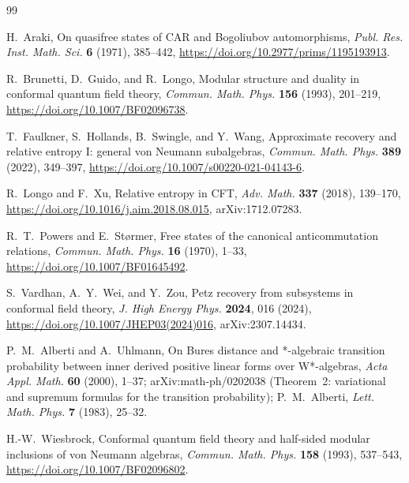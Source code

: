 \documentclass[11pt]{article}
\theoremstyle{accent}
\theoremstyle{definition}
\begin{document}
\begin{thebibliography}{99}

H.~Araki,
\newblock On quasifree states of CAR and Bogoliubov automorphisms,
\newblock \emph{Publ. Res. Inst. Math. Sci.} \textbf{6} (1971), 385--442,
\newblock \url{https://doi.org/10.2977/prims/1195193913}.

R.~Brunetti, D.~Guido, and R.~Longo,
\newblock Modular structure and duality in conformal quantum field theory,
\newblock \emph{Commun. Math. Phys.} \textbf{156} (1993), 201--219,
\newblock \url{https://doi.org/10.1007/BF02096738}.

T.~Faulkner, S.~Hollands, B.~Swingle, and Y.~Wang,
\newblock Approximate recovery and relative entropy I: general von Neumann subalgebras,
\newblock \emph{Commun. Math. Phys.} \textbf{389} (2022), 349--397,
\newblock \url{https://doi.org/10.1007/s00220-021-04143-6}.

R.~Longo and F.~Xu,
\newblock Relative entropy in CFT,
\newblock \emph{Adv. Math.} \textbf{337} (2018), 139--170,
\newblock \url{https://doi.org/10.1016/j.aim.2018.08.015},
\newblock arXiv:1712.07283.

R.~T.~Powers and E.~St{\o}rmer,
\newblock Free states of the canonical anticommutation relations,
\newblock \emph{Commun. Math. Phys.} \textbf{16} (1970), 1--33,
\newblock \url{https://doi.org/10.1007/BF01645492}.

S.~Vardhan, A.~Y.~Wei, and Y.~Zou,
\newblock Petz recovery from subsystems in conformal field theory,
\newblock \emph{J. High Energy Phys.} \textbf{2024}, 016 (2024),
\newblock \url{https://doi.org/10.1007/JHEP03(2024)016},
\newblock arXiv:2307.14434.

P.~M.~Alberti and A.~Uhlmann,
\newblock On Bures distance and *-algebraic transition probability between inner derived positive linear forms over W*-algebras,
\newblock \emph{Acta Appl. Math.} \textbf{60} (2000), 1--37; arXiv:math-ph/0202038 (Theorem~2: variational and supremum formulas for the transition probability); P.~M.~Alberti, \emph{Lett. Math. Phys.} \textbf{7} (1983), 25--32.

H.-W.~Wiesbrock,
\newblock Conformal quantum field theory and half-sided modular inclusions of von Neumann algebras,
\newblock \emph{Commun. Math. Phys.} \textbf{158} (1993), 537--543,
\newblock \url{https://doi.org/10.1007/BF02096802}.

\end{thebibliography}
\end{document}
